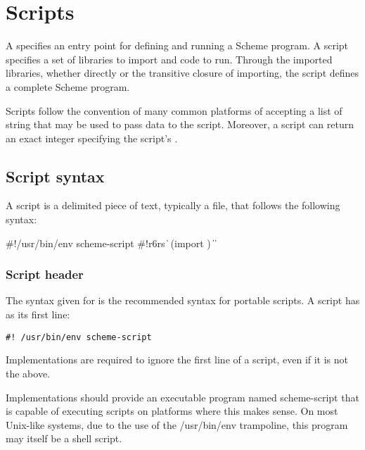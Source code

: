\chapter{Scripts}
\label{scriptchapter}

A  specifies an entry point for defining and running
a Scheme program.  A script specifies a set of libraries to import and
code to run.  Through the imported libraries, whether directly or the
transitive closure of importing, the script defines a complete Scheme
program.

Scripts follow the convention of many common platforms of accepting a
list of string  that may be used to
pass data to the script.  Moreover, a script can return an exact
integer specifying the script's .

\section{Script syntax}

A script is a delimited piece of text, typically a file, that follows
the following syntax:

\begin{grammar}
 \: \#!/usr/bin/env
  \> scheme-script 
  \> 
 \: \#!r6rs  
  \> \|  
 \: (import )
 \:  
 \: 
\> \| 
\> \| 
\end{grammar}

\subsection{Script header}

The syntax given for  is the recommended syntax for 
portable scripts.  A script has as its first line:
\begin{verbatim}
#! /usr/bin/env scheme-script
\end{verbatim}
%
Implementations are required to ignore the first 
line of a script, even if it is not the above.

Implementations should provide an executable program named {\cf scheme-script}
that is capable of executing scripts on platforms where this makes
sense.  On most Unix-like systems, due to the 
use of the {\cf /usr/bin/env} trampoline, this program may itself be a shell 
script.


